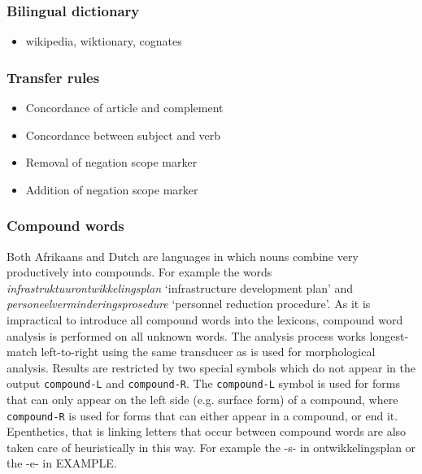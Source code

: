 \documentclass[11pt]{article}
\begin{document}
\subsubsection{Bilingual dictionary}

\begin{itemize}
\item wikipedia, wiktionary, cognates
\end{itemize}

\subsubsection{Transfer rules}


\begin{itemize}
\item Concordance of article and complement
\item Concordance between subject and verb
\item Removal of negation scope marker
\end{itemize}

\begin{itemize}
\item Addition of negation scope marker
\end{itemize}


\subsubsection{Compound words}


Both Afrikaans and Dutch are languages in which nouns combine very
productively into compounds. For example the words {\em infrastruktuurontwikkelingsplan}
`infrastructure development plan' and {\em personeelverminderingsprosedure}
`personnel reduction procedure'. As it is impractical to introduce
all compound words into the lexicons, compound word analysis is performed on
all unknown words. The analysis process works longest-match left-to-right
using the same transducer as is used for morphological analysis.
Results are restricted by two special
symbols which do not appear in the output {\small {\tt compound-L}} and {\small {\tt compound-R}}.
The {\small {\tt compound-L}} symbol is used for forms that can only appear on the
left side (e.g. surface form) of a compound, where {\small {\tt compound-R}} is
used for forms that can either appear in a compound, or end it.
Epenthetics, that is linking letters that occur between compound words
are also taken care of heuristically in this way. For example the -s-
in ontwikkelingsplan or the -e- in EXAMPLE.
\end{document}
